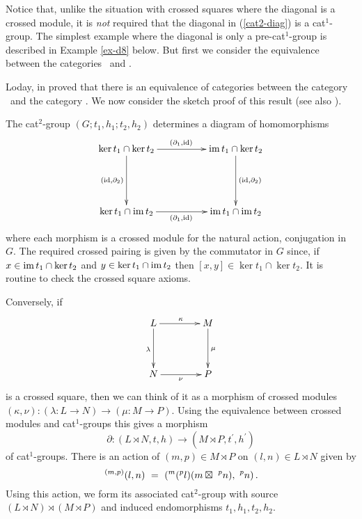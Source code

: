 \documentclass[a4paper,11pt]{article}
\theoremstyle{plain}
\theoremstyle{definition}
\begin{document}
Notice that, unlike the situation with crossed squares 
where the diagonal is a crossed module, 
it is \emph{not} required that the diagonal in (\ref{cat2-diag}) 
is a cat$^1$-group. 
The simplest example where the diagonal is only a pre-cat$^1$-group 
is described in Example \ref{ex-d8} below. 
But first we consider the equivalence between the categories 
\catXSq\ and \catCatt. 

Loday, in \cite{Loday} proved that there is an equivalence of categories 
between the category \catCatt\ and the category \catXSq.
We now consider the sketch proof of this result 
(see also \cite{mutlu-porter-2003}). 

The cat$^{2}$-group $(G;t_1,h_1;t_2,h_2)$ determines a diagram of homomorphisms 
\begin{equation} \label{ker-im-diag}
\xymatrix@R=50pt@C=50pt
{ \ker t_1 \cap \ker t_2 \ar[d]_{(\id,\partial_2)} \ar[r]^{(\partial_1,\id)} 
  	  & \im t_1 \cap \ker t_2 \ar[d]^{(\id,\partial_2)} \\ 
  \ker t_1 \cap \im t_2 \ar[r]_{(\partial_1,\id)}  
	  & \im t_1 \cap \im t_2 } 
\end{equation} 
\noindent where each morphism is a crossed module for the natural action, 
conjugation in $G$. 
The required crossed pairing is given by the commutator in $G$ since, 
if $x \in \mathrm{im}\, t_1 \cap \ker t_2$ and $y \in \ker t_1 \cap \mathrm{im}\, t_2$ 
then $[x,y] \in \ker t_1 \cap \ker t_2$. 
It is routine to check the crossed square axioms.
	
Conversely, if
\[
\xymatrix@R=40pt@C=40pt
{ L \ar[d]_{\lambda} \ar[r]^{\kappa}  
	  & M \ar[d]^{\mu} \\ 
  N \ar[r]_{\nu} 
	  & P }  
\]
\noindent is a crossed square, 
then we can think of it as a morphism of crossed modules 
$(\kappa,\nu) : (\lambda : L \to N) \rightarrow (\mu : M  \to P)$.
Using the equivalence between crossed modules and cat$^{1}$-groups this
gives a morphism
\[
\partial : (L \rtimes N,t,h) \longrightarrow (M \rtimes P, t^{\prime}, h^{\prime})
\]
of cat$^{1}$-groups. 
There is an action of $(m,p) \in M \rtimes P$ on $(l,n) \in L \rtimes N$ 
given by
\[
^{(m,p)}(l,n) ~=~ (^{m}(^{p}l) (m \boxtimes\ ^{p}n),\ ^{p}n)\,.
\] 
Using this action, we form its associated cat$^{2}$-group with source  
$(L \rtimes N) \rtimes (M \rtimes P)$ 
and induced endomorphisms $t_1,h_1,t_2,h_2$. 
\end{document}
